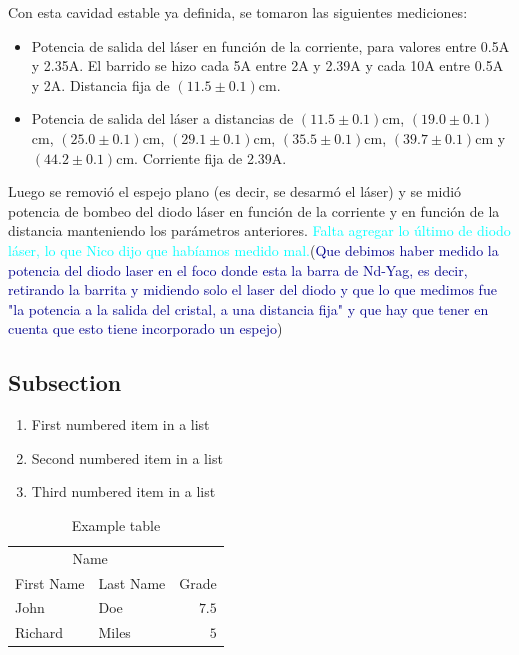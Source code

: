 \documentclass[10pt, a4paper]{article}%
\begin{document}
\begin{multicols}{2}
Con esta cavidad estable ya definida, se tomaron las siguientes mediciones:
\begin{itemize}
    \item Potencia de salida del láser en función de la corriente, para valores entre 0.5A y 2.35A. El barrido se hizo cada 5A entre 2A y 2.39A y cada 10A entre 0.5A y 2A. Distancia fija de $(11.5 \pm 0.1)$cm. 
    \item Potencia de salida del láser a distancias de $(11.5 \pm 0.1)$cm, $(19.0 \pm 0.1)$cm, $(25.0 \pm 0.1)$cm, $(29.1 \pm 0.1)$cm, $(35.5 \pm 0.1)$cm, $(39.7 \pm 0.1)$cm y $(44.2 \pm 0.1)$cm. Corriente fija de 2.39A. 
\end{itemize}
Luego se removió el espejo plano (es decir, se desarmó el láser) y se midió potencia de bombeo del diodo láser en función de la corriente y en función de la distancia manteniendo los parámetros anteriores. \textcolor{cyan}{Falta agregar lo último de diodo láser, lo que Nico dijo que habíamos medido mal.}({\textcolor{DarkBlue}{Que debimos haber medido la potencia del diodo laser en el foco donde esta la barra de Nd-Yag, es decir, retirando la barrita y midiendo solo el laser del diodo y que lo que medimos fue "la potencia a la salida del cristal, a una distancia fija" y que hay que tener en cuenta que esto tiene incorporado un espejo}})





\subsection{Subsection}

\begin{enumerate}
	\item First numbered item in a list
	\item Second numbered item in a list
	\item Third numbered item in a list
\end{enumerate}



\begin{table}
	\caption{Example table}
	\centering
	\begin{tabular}{llr}
		\toprule
		\multicolumn{2}{c}{Name} \\
		\cmidrule(r){1-2}
		First Name & Last Name & Grade \\
		\midrule
		John & Doe & $7.5$ \\
		Richard & Miles & $5$ \\
		\bottomrule
	\end{tabular}
\end{table}


\end{multicols}
\end{document}

